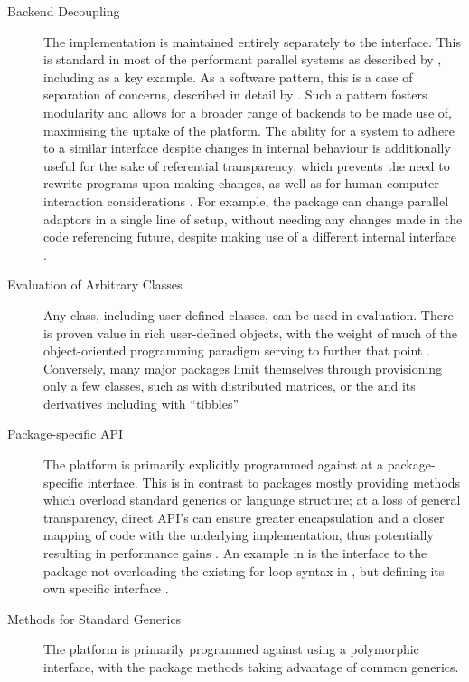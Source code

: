 \begin{description}
	\item[Backend Decoupling]
		The implementation is maintained entirely separately to the interface.
		This is standard in most of the performant parallel \R{} systems as described by \textcite{eddelbuettel2019parallel}, including  as a key example\cite{microsoft20}.
		As a software pattern, this is a case of separation of concerns, described in detail by \textcite{dijkstra1982role}.
		Such a pattern fosters modularity and allows for a broader range of backends to be made use of, maximising the uptake of the platform.
		The ability for a system to adhere to a similar interface despite changes in internal behaviour is additionally useful for the sake of referential transparency, which prevents the need to rewrite programs upon making changes, as well as for human-computer interaction considerations \cites{sondergaard1990Rtda,norman2013design}.
		For example, the  package can change parallel adaptors in a single line of setup, without needing any changes made in the code referencing future, despite making use of a different internal interface \cite{weston19:_using}.
	\item[Evaluation of Arbitrary Classes]
		Any class, including user-defined classes, can be used in evaluation.
		There is proven value in rich user-defined objects, with the weight of much of the object-oriented programming paradigm serving to further that point \cite{dahl2004simula}.
		Conversely, many major packages limit themselves through provisioning only a few classes, such as  with distributed matrices, or the  and its derivatives including  with ``tibbles'' \cites{pbdDMATpackage,wickham2019welcome} \item[Package-specific API] The platform is primarily explicitly programmed against at a package-specific interface.
		This is in contrast to packages mostly providing methods which overload standard generics or language structure; at a loss of general transparency, direct API's can ensure greater encapsulation and a closer mapping of code with the underlying implementation, thus potentially resulting in performance gains \cite{bierhoff2009api}.
		An example in \R{} is the interface to the  package not overloading the existing for-loop syntax in \R{}, but defining its own specific interface \cite{microsoft20}.
	\item[Methods for Standard Generics]
		The platform is primarily programmed against using a polymorphic
		interface, with the package methods taking advantage of common generics.

\end{description}
